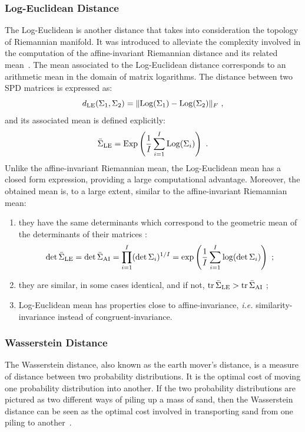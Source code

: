 \subsubsection{Log-Euclidean Distance}
The Log-Euclidean is another distance that takes into consideration the topology of Riemannian manifold. 
It was introduced to alleviate the complexity involved in the computation of the affine-invariant Riemannian distance and its related mean~\cite{arsigny_geometric_2007}. 
The mean associated to the Log-Euclidean distance corresponds to an arithmetic mean in the domain of matrix logarithms.  
The distance between two SPD matrices is expressed as:
\begin{equation}
\distLE(\P_1, \P_2) = \lVert \Logm(\P_1)-\Logm(\P_2) \rVert_F \ ,
\label{eq:dist_LE}
\end{equation}
and its associated mean is defined explicitly:
\begin{equation}
\PmLE = \Expm \left( \frac{1}{\Nb} \sum_{\nb=1}^{\Nb} \Logm(\P_\nb) \right) \ .
\label{eq:mean_LE}
\end{equation}
Unlike the affine-invariant Riemannian mean, the Log-Euclidean mean has a closed form expression, providing a large computational advantage. 
Moreover, the obtained mean is, to a large extent, similar to the affine-invariant Riemannian mean:
\begin{enumerate}[label=(\roman*)]
\item they have the same determinants which correspond to the geometric mean of the determinants of their matrices  \citep{arsigny_geometric_2007}: \[ \det \bar{\Sigma}_{\operatorname{LE}} = \det \bar{\Sigma}_{\operatorname{AI}}  = \prod_{i=1}^{I} (\det \Sigma_{i})^{1/I} = \exp \left( \frac{1}{I} \sum_{i=1}^{I} \log( \det \Sigma_{i}) \right) \ ; \]
\item they are similar, in some cases identical, and if not, $\operatorname{tr} \bar{\Sigma}_{\operatorname{LE}} > \operatorname{tr} \bar{\Sigma}_{\operatorname{AI}}$ ;
\item Log-Euclidean mean has properties close to affine-invariance, \textit{i.e.} similarity-invariance instead of congruent-invariance.
\end{enumerate}

\subsubsection{Wasserstein Distance}

The Wasserstein distance, also known as the earth mover's distance, is a measure of distance between two probability distributions. It is the optimal cost of moving one probability distribution into another. 
If the two probability distributions are pictured as two different ways of piling up a mass of sand, then the Wasserstein distance can be seen as the optimal cost involved in transporting sand from one piling to another~\cite{VIL08}.

